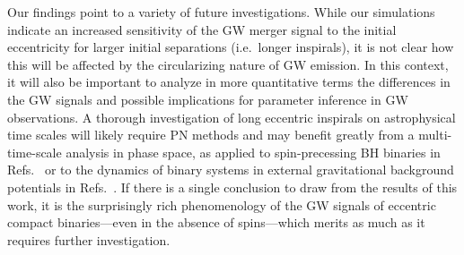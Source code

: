 %
Our findings point to a variety of future investigations. While our
simulations indicate an increased sensitivity of the GW merger signal
to the initial eccentricity for larger initial separations
(i.e.~longer inspirals), it is not clear how this will be affected by
the circularizing nature of GW emission. In this context, it will also
be important to analyze in more quantitative terms the differences in
the GW signals and possible implications for parameter inference in GW
observations. A thorough investigation of long eccentric inspirals on
astrophysical time scales will likely require PN methods and may
benefit greatly from a multi-time-scale analysis in phase space, as
applied to spin-precessing BH binaries in
Refs.~\cite{Kesden:2014sla,Gerosa:2015tea} or to the dynamics of
binary systems in external gravitational background potentials in
Refs.~\cite{Hamilton:2019a,Hamilton:2019b}. If there is a single
conclusion to draw from the results of this work, it is the
surprisingly rich phenomenology of the GW signals of eccentric compact
binaries---even in the absence of spins---which merits as much as it
requires further investigation.


